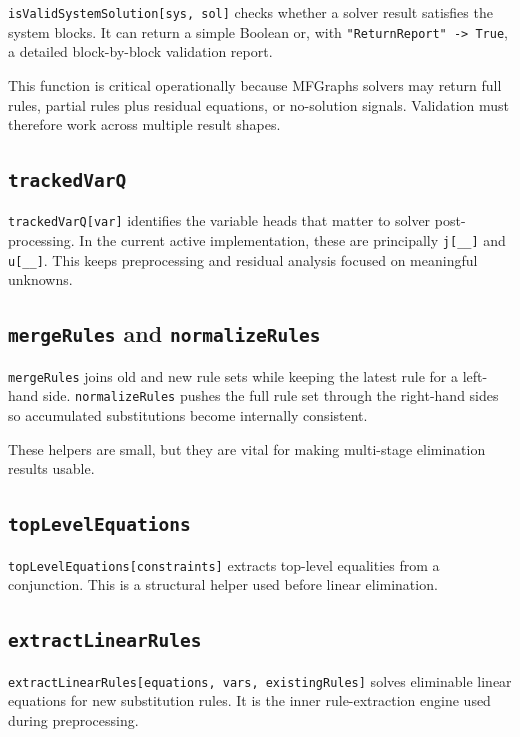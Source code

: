 \documentclass[11pt]{article}
\begin{document}
\texttt{isValidSystemSolution[sys, sol]} checks whether a solver result satisfies the system blocks. It can return a simple Boolean or, with \texttt{"ReturnReport" -> True}, a detailed block-by-block validation report.

This function is critical operationally because MFGraphs solvers may return full rules, partial rules plus residual equations, or no-solution signals. Validation must therefore work across multiple result shapes.

\subsection*{\texttt{trackedVarQ}}

\texttt{trackedVarQ[var]} identifies the variable heads that matter to solver post-processing. In the current active implementation, these are principally \texttt{j[\_\_]} and \texttt{u[\_\_]}. This keeps preprocessing and residual analysis focused on meaningful unknowns.

\subsection*{\texttt{mergeRules} and \texttt{normalizeRules}}

\texttt{mergeRules} joins old and new rule sets while keeping the latest rule for a left-hand side. \texttt{normalizeRules} pushes the full rule set through the right-hand sides so accumulated substitutions become internally consistent.

These helpers are small, but they are vital for making multi-stage elimination results usable.

\subsection*{\texttt{topLevelEquations}}

\texttt{topLevelEquations[constraints]} extracts top-level equalities from a conjunction. This is a structural helper used before linear elimination.

\subsection*{\texttt{extractLinearRules}}

\texttt{extractLinearRules[equations, vars, existingRules]} solves eliminable linear equations for new substitution rules. It is the inner rule-extraction engine used during preprocessing.
\end{document}
